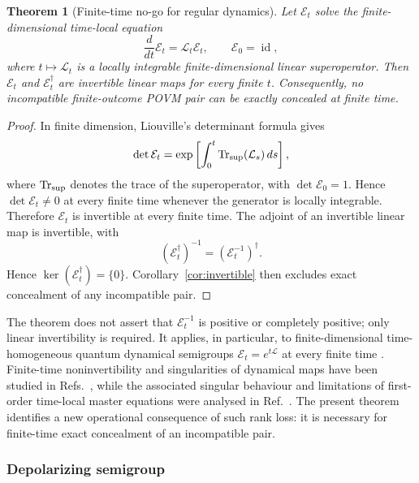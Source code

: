 \documentclass[
aps,pra,twocolumn,10pt,
superscriptaddress,longbibliography,floatfix
]{revtex4-2}
\DeclareMathOperator{\id}{id}
\newtheorem{theorem}{Theorem}[section]
\begin{document}
\begin{theorem}[Finite-time no-go for regular dynamics]
\label{thm:regular_no_go}
Let $\mathcal E_t$ solve the finite-dimensional time-local equation
\begin{equation}
\frac{d}{dt}\mathcal E_t=\mathcal L_t\mathcal E_t,
\qquad \mathcal E_0=\id,
\label{eq:time_local}
\end{equation}
where $t\mapsto\mathcal L_t$ is a locally integrable finite-dimensional linear superoperator. Then $\mathcal E_t$ and $\mathcal E_t^\dagger$ are invertible linear maps for every finite $t$. Consequently, no incompatible finite-outcome POVM pair can be exactly concealed at finite time.
\end{theorem}

\begin{proof}
In finite dimension, Liouville's determinant formula gives
\[
\det\mathcal E_t
=
\exp\left[
\int_0^t
\operatorname{Tr}_{\rm sup}(\mathcal L_s)\,ds
\right],
\]
where $\operatorname{Tr}_{\rm sup}$ denotes the trace of the superoperator, with $\det\mathcal E_0=1$. Hence $\det\mathcal E_t\neq0$ at every finite time whenever the generator is locally integrable. Therefore $\mathcal E_t$ is invertible at every finite time. The adjoint of an invertible linear map is invertible, with
\[
(\mathcal E_t^\dagger)^{-1}
=
(\mathcal E_t^{-1})^\dagger.
\]
Hence $\ker(\mathcal E_t^\dagger)=\{0\}$. Corollary~\ref{cor:invertible} then excludes exact concealment of any incompatible pair.
\end{proof}

The theorem does not assert that $\mathcal E_t^{-1}$ is positive or completely positive; only linear invertibility is required. It applies, in particular, to finite-dimensional time-homogeneous quantum dynamical semigroups $\mathcal E_t=e^{t\mathcal L}$ at every finite time \cite{Gorini1976,Lindblad1976,Breuer2007}. Finite-time noninvertibility and singularities of dynamical maps have been studied in Refs.~\cite{Hou2012,Chruscinski2018}, while the associated singular behaviour and limitations of first-order time-local master equations were analysed in Ref.~\cite{Hegde2021}. The present theorem identifies a new operational consequence of such rank loss: it is necessary for finite-time exact concealment of an incompatible pair.

\subsubsection*{Depolarizing semigroup}
\end{document}
